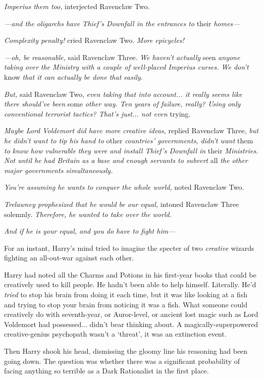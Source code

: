 \emph{Imperius them too,} interjected Ravenclaw Two.

\emph{—and the oligarchs have Thief’s Downfall in the entrances to} their \emph{homes—}

\emph{Complexity penalty!} cried Ravenclaw Two. \emph{More epicycles!}

\emph{—oh, be reasonable,} said Ravenclaw Three. \emph{We haven’t actually} seen \emph{anyone taking over the Ministry with a couple of well-placed Imperius curses. We don’t} know \emph{that it can actually be done that easily.}

\emph{But,} said Ravenclaw Two, \emph{even taking that into account... it really seems like there should’ve been} some \emph{other way. Ten years of failure, really? Using only conventional terrorist tactics? That’s just... not even} trying.

\emph{Maybe Lord Voldemort did have more creative ideas,} replied Ravenclaw Three, \emph{but he didn’t want to tip his hand to} other \emph{countries’ governments, didn’t want} them \emph{to know how vulnerable they were and install Thief’s Downfall in} their \emph{Ministries. Not until he had Britain as a base and enough servants to subvert} all \emph{the other major governments simultaneously.}

\emph{You’re assuming he wants to conquer the whole world,} noted Ravenclaw Two.

\emph{Trelawney prophesized that he would be our equal,} intoned Ravenclaw Three solemnly. \emph{Therefore, he wanted to take over the world.}

\emph{And if he is your equal, and you do have to fight him—}

For an instant, Harry’s mind tried to imagine the specter of two \emph{creative} wizards fighting an all-out-war against each other.

Harry had noted all the Charms and Potions in his first-year books that could be creatively used to kill people. He hadn’t been able to help himself. Literally. He’d \emph{tried} to stop his brain from doing it each time, but it was like looking at a fish and trying to stop your brain from noticing it was a fish. What someone could creatively do with seventh-year, or Auror-level, or ancient lost magic such as Lord Voldemort had possessed... didn’t bear thinking about. A magically-superpowered creative-genius psychopath wasn’t a ‘threat’, it was an extinction event.

Then Harry shook his head, dismissing the gloomy line his reasoning had been going down. The question was whether there was a significant probability of facing anything so terrible as a Dark Rationalist in the first place.

